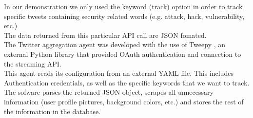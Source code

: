 \documentclass[12pt]{article}
\begin{document}
In our demonstration we only used the keyword (track) option in order to track specific tweets containing security related words (e.g. attack, hack, vulnerability, etc.)\\

The data returned from this particular API call are JSON fomated.\\

The Twitter aggregation agent was developed with the use of Tweepy \cite{tweepy}, an external Python library that provided OAuth authentication and connection to the streaming API.\\ This agent reads its configuration from an external YAML file. This includes Authentication credentials, as well as the specific keywords that we want to track.\\

The sofware parses the returned JSON object, scrapes all unnecessary information (user profile pictures, background colors, etc.) and stores the rest of the information in the database.  

\newpage
\end{document}
